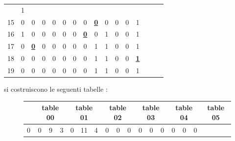 \begin{esempio}
\begin{table}[H]
\begin{tabular}{c|ccccccccccccccc}
                                                                & 1 \\
       15 & 0 & 0 & 0 & 0 & 0 & 0 & 0 & {\color{nordred}\textbf{\underline{0}}} & 0 & 0 & 0
                                                                & 1 \\
       16 & 1 & 0 & 0 & 0 & 0 & 0 & {\color{nordred}\textbf{\underline{0}}} & 0 & 1 & 0 & 0
                                                                & 1 \\
       17 & 0 & {\color{nordred}\textbf{\underline{0}}} & 0 & 0 & 0 & 0 & 0 & 1 & 1 & 0 & 0
                                                                & 1 \\
       18 & 0 & 0 & 0 & 0 & 0 & 0 & 0 & 1 & 1 & 0 & 0
                                                                & {\color{nordred}\textbf{\underline{1}}} \\ 
       19 & 0 & 0 & 0 & 0 & 0 & 0 & 0 & 1 & 1 & 0 & 0 & 1 \\
     \end{tabular}
   \end{table}
   \newpage
   \noindent
   si costruiscono le seguenti tabelle \cite{tricks}:
   \begin{figure}[H]
     \centering
     \footnotesize
     {\begin{tabular}{r|rrr|rrr|rrr|rrr|rrr|rrr}
        \multicolumn{1}{c}{} &
                               \multicolumn{3}{c}{table 00} &
                                                             \multicolumn{3}{c}{table 01} &
                                                                                           \multicolumn{3}{c}{table 02} &
                                                                                                                         \multicolumn{3}{c}{table 03} &
                                                                                                                                                       \multicolumn{3}{c}{table 04} &
                                                                                                                                                                                     \multicolumn{3}{c}{table 05} \\
        \hline
        0 &  0 &  9 &  3 &  0 & 11 &  4 &  0 &  0 &  0 &  \textcolor{nordred}{0} &  \textcolor{nordred}{0} &  \textcolor{nordred}{0}
                                        &  \textcolor{nordred}{0} &  \textcolor{nordred}{0} &  \textcolor{nordred}{0}

\end{tabular}}
\end{figure}
\end{esempio}
